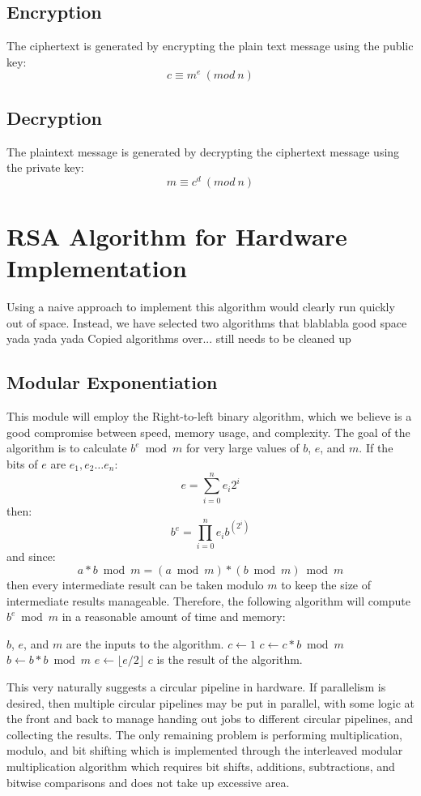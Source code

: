 \documentclass[a4paper,11pt]{report}
\begin{document}
\subsection{Encryption}
The ciphertext is generated by encrypting the plain text message using the public key:
\begin{equation}
  c \equiv m^e\ (mod\ n)
\end{equation}
\subsection{Decryption}
The plaintext message is generated by decrypting the ciphertext message using the private key:
\begin{equation}
  m \equiv c^d\ (mod\ n)
\end{equation}
\section{RSA Algorithm for Hardware Implementation}
Using a naive approach to implement this algorithm would clearly run quickly out of space.  Instead, we have selected two algorithms that blablabla good space yada yada yada
Copied algorithms over... still needs to be cleaned up
\subsection{Modular Exponentiation}
This module will employ the Right-to-left binary algorithm, which we believe is a good compromise between speed, memory usage, and complexity.
The goal of the algorithm is to calculate $b^e \bmod m$ for very large values of $b$, $e$, and $m$.
If the bits of $e$ are $e_1, e_2 \dots e_n$:
\begin{equation}
e = \sum_{i = 0}^{n} e_i 2^i
\end{equation}
then:
\begin{equation}
b^e = \prod_{i = 0}^{n} e_i b^{(2^i)}
\end{equation}
and since:
\begin{equation}
a * b \bmod m = (a \bmod m) * (b \bmod m) \bmod m
\end{equation}
then every intermediate result can be taken modulo $m$ to keep the size of intermediate results manageable.
Therefore, the following algorithm will compute $b^e \bmod m$ in a reasonable amount of time and memory:
\begin{algorithmic}
\State $b$, $e$, and $m$ are the inputs to the algorithm.
\State $c \gets 1$
		\State $c \gets c * b \bmod m$
	\EndIf
	\State $b \gets b * b \bmod m$
	\State $e \gets \lfloor e / 2 \rfloor$
\EndWhile
\State $c$ is the result of the algorithm.
\end{algorithmic}
This very naturally suggests a circular pipeline in hardware.
If parallelism is desired, then multiple circular pipelines may be put in parallel,
with some logic at the front and back to manage handing out jobs to different circular pipelines,
and collecting the results.
The only remaining problem is performing multiplication, modulo, and bit shifting which is implemented through the interleaved modular multiplication algorithm which requires bit shifts, additions, subtractions, and bitwise comparisons and does not take up excessive area. 
\end{document}
